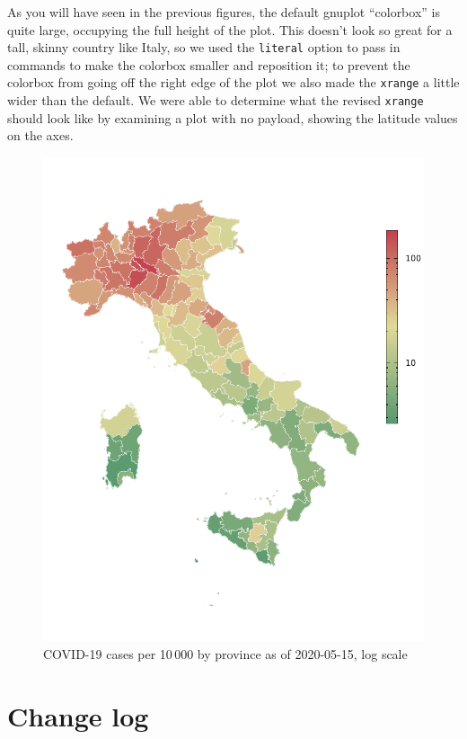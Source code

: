 \documentclass{article}
\begin{document}
As you will have seen in the previous figures, the default
\textsf{gnuplot} ``colorbox'' is quite large, occupying the full
height of the plot.  This doesn't look so great for a tall, skinny
country like Italy, so we used the \texttt{literal} option to pass in
commands to make the colorbox smaller and reposition it; to prevent
the colorbox from going off the right edge of the plot we also made
the \texttt{xrange} a little wider than the default. We were able to
determine what the revised \texttt{xrange} should look like by
examining a plot with no payload, showing the latitude values on the
axes.

\begin{figure}[p]
  \centering
  \includegraphics{covid.pdf}
  \caption{COVID-19 cases per 10\,000 by province as of
    2020-05-15, log scale}
  \label{fig:ita-covid}
\end{figure}

\section{Change log}
\end{document}
